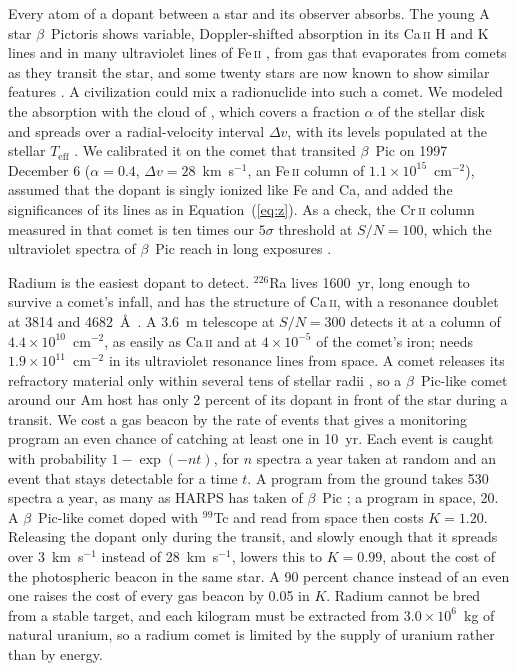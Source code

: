 \documentclass[final,5p]{elsarticle}
\begin{document}
Every atom of a dopant between a star and its observer absorbs. The young A star $\beta$~Pictoris shows variable, Doppler-shifted absorption in its Ca\,\textsc{ii} H and K lines \citep{Kiefer2014} and in many ultraviolet lines of Fe\,\textsc{ii} \citep{Vrignaud2024a}, from gas that evaporates from comets as they transit the star, and some twenty stars are now known to show similar features \citep{Rebollido2020}. A civilization could mix a radionuclide into such a comet. We modeled the absorption with the cloud of \citet{Vrignaud2024a}, which covers a fraction $\alpha$ of the stellar disk and spreads over a radial-velocity interval $\Delta v$, with its levels populated at the stellar $T_\mathrm{eff}$ \citep{Vrignaud2024b}. We calibrated it on the comet that transited $\beta$~Pic on 1997 December 6 ($\alpha = 0.4$, $\Delta v = 28$~km~s$^{-1}$, an Fe\,\textsc{ii} column of $1.1\times10^{15}$~cm$^{-2}$), assumed that the dopant is singly ionized like Fe and Ca, and added the significances of its lines as in Equation~(\ref{eq:z}). As a check, the Cr\,\textsc{ii} column measured in that comet is ten times our $5\sigma$ threshold at $S/N = 100$, which the ultraviolet spectra of $\beta$~Pic reach in long exposures \citep{Vrignaud2024a}.

Radium is the easiest dopant to detect. $^{226}$Ra lives 1600~yr, long enough to survive a comet's infall, and  has the structure of Ca\,\textsc{ii}, with a resonance doublet at 3814 and 4682~\AA\ \citep{NIST2024}. A 3.6~m telescope at $S/N = 300$ detects it at a column of $4.4\times10^{10}$~cm$^{-2}$, as easily as Ca\,\textsc{ii} and at $4\times10^{-5}$ of the comet's iron;  needs $1.9\times10^{11}$~cm$^{-2}$ in its ultraviolet resonance lines from space. A comet releases its refractory material only within several tens of stellar radii \citep{Kiefer2019}, so a $\beta$~Pic-like comet around our Am host has only 2 percent of its dopant in front of the star during a transit. We cost a gas beacon by the rate of events that gives a monitoring program an even chance of catching at least one in 10~yr. Each event is caught with probability $1 - \exp(-nt)$, for $n$ spectra a year taken at random and an event that stays detectable for a time $t$. A program from the ground takes 530 spectra a year, as many as HARPS has taken of $\beta$~Pic \citep{Hoeijmakers2025}; a program in space, 20. A $\beta$~Pic-like comet doped with $^{99}$Tc and read from space then costs $K = 1.20$. Releasing the dopant only during the transit, and slowly enough that it spreads over 3~km~s$^{-1}$ instead of 28~km~s$^{-1}$, lowers this to $K = 0.99$, about the cost of the photospheric beacon in the same star. A 90 percent chance instead of an even one raises the cost of every gas beacon by 0.05 in $K$. Radium cannot be bred from a stable target, and each kilogram must be extracted from $3.0\times10^{6}$~kg of natural uranium, so a radium comet is limited by the supply of uranium rather than by energy.
\end{document}
